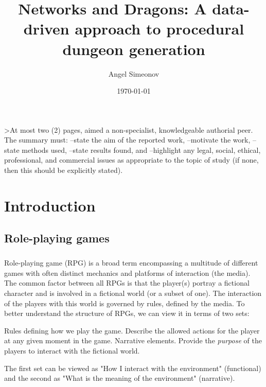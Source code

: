 \documentclass{UoYCSproject}
\author{Angel Simeonov}
\title{Networks and Dragons: A data-driven approach to procedural dungeon generation}
\date{\today}
\begin{document}
\maketitle
\listoffigures
\listoftables

\begin{summary}
>At most two (2) pages, aimed a non-specialist, knowledgeable authorial peer.
The summary must:
--state the aim of the reported work,
--motivate the work,
--state methods used,
--state results found, and
--highlight any legal, social, ethical, professional, and commercial issues as appropriate to the topic of study (if none, then this should be explicitly stated).
\end{summary}

\chapter{Introduction}
\label{cha:Introduction}

\section{Role-playing games}

\paragraph{}
Role-playing game (RPG) is a broad term encompassing a multitude of different games with often distinct mechanics and platforms of interaction (the media). The common factor between all RPGs is that the player(s) portray a fictional character and is involved in a fictional world (or a subset of one). The interaction of the players with this world is governed by rules, defined by the media. To better understand the structure of RPGs, we can view it in terms of two sets: 
\begin{outline}[enumerate]
  \1 Rules defining how we play the game. Describe the allowed actions for the player at any given moment in the game.
  \1 Narrative elements. Provide the \textit{purpose} of the players to interact with the fictional world. 
\end{outline}
The first set can be viewed as "How I interact with the environment" (functional) and the second as "What is the meaning of the environment" (narrative).
\end{document}
